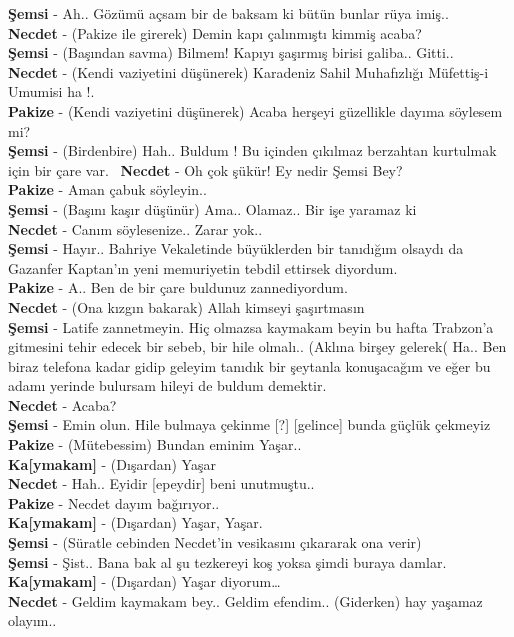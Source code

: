 \documentclass[]{book}
\begin{document}
\textbf{Şemsi} - Ah.. Gözümü açsam bir de baksam ki bütün bunlar rüya imiş..\\
\textbf{Necdet} - (Pakize ile girerek) Demin kapı çalınmıştı kimmiş acaba?\\
\textbf{Şemsi} - (Başından savma) Bilmem! Kapıyı şaşırmış birisi galiba.. Gitti..\\
\textbf{Necdet} - (Kendi vaziyetini düşünerek) Karadeniz Sahil Muhafızlığı Müfettiş-i Umumisi ha !.\\
\textbf{Pakize} - (Kendi vaziyetini düşünerek) Acaba herşeyi güzellikle dayıma söylesem mi?\\
\textbf{Şemsi} - (Birdenbire) Hah.. Buldum ! Bu içinden çıkılmaz berzahtan kurtulmak için bir çare var.~
\textbf{Necdet} - Oh çok şükür! Ey nedir Şemsi Bey?\\
\textbf{Pakize} - Aman çabuk söyleyin..\\
\textbf{Şemsi} - (Başını kaşır düşünür) Ama.. Olamaz.. Bir işe yaramaz ki\\
\textbf{Necdet} - Canım söylesenize.. Zarar yok..\\
\textbf{Şemsi} - Hayır.. Bahriye Vekaletinde büyüklerden bir tanıdığım olsaydı da Gazanfer Kaptan'ın yeni memuriyetin tebdil ettirsek diyordum.\\
\textbf{Pakize} - A.. Ben de bir çare buldunuz zannediyordum.\\
\textbf{Necdet} - (Ona kızgın bakarak) Allah kimseyi şaşırtmasın\\
\textbf{Şemsi} - Latife zannetmeyin. Hiç olmazsa kaymakam beyin bu hafta Trabzon'a gitmesini tehir edecek bir sebeb, bir hile olmalı.. (Aklına birşey gelerek( Ha.. Ben biraz telefona kadar gidip geleyim tanıdık bir şeytanla konuşacağım ve eğer bu adamı yerinde bulursam hileyi de buldum demektir.\\
\textbf{Necdet} - Acaba?\\
\textbf{Şemsi} - Emin olun. Hile bulmaya çekinme {[}?{]} {[}gelince{]} bunda güçlük çekmeyiz\\
\textbf{Pakize} - (Mütebessim) Bundan eminim Yaşar..\\
\textbf{Ka{[}ymakam{]}} - (Dışardan) Yaşar\\
\textbf{Necdet} - Hah.. Eyidir {[}epeydir{]} beni unutmuştu..\\
\textbf{Pakize} - Necdet dayım bağırıyor..\\
\textbf{Ka{[}ymakam{]}} - (Dışardan) Yaşar, Yaşar.\\
\textbf{Şemsi} - (Süratle cebinden Necdet'in vesikasını çıkararak ona verir)\\
\textbf{Şemsi} - Şist.. Bana bak al şu tezkereyi koş yoksa şimdi buraya damlar.\\
\textbf{Ka{[}ymakam{]}} - (Dışardan) Yaşar diyorum\ldots{}\\
\textbf{Necdet} - Geldim kaymakam bey.. Geldim efendim.. (Giderken) hay yaşamaz olayım..\\
\end{document}
